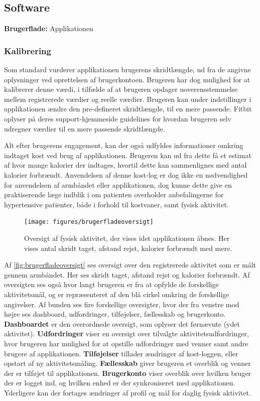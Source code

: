 \subsection{Software}
\textbf{Brugerflade:} %
Applikationen  

\subsubsection{Kalibrering}
Som standard vurderer applikationen brugerens skridtlængde, ud fra de angivne oplysninger ved oprettelsen af brugerkontoen. Brugeren har dog mulighed for at kalibrerer denne værdi, i tilfælde af at brugeren opdager uoverensstemmelse mellem registrerede værdier og reelle værdier. Brugeren kan under indstillinger i applikationen ændre den pre-defineret skridtlængde, til en mere passende. Fitbit oplyser på deres support-hjemmeside guidelines for hvordan brugeren selv udregner værdier til en mere passende skridtlængde.   

Alt efter brugerens engagement, kan der også udfyldes informationer omkring indtaget kost ved brug af applikationen. Brugeren kan ud fra dette få et estimat af hvor mange kalorier der indtages, hvortil dette kan sammenlignes med antal kalorier forbrændt. Anvendelsen af denne kost-log er dog ikke en nødvendighed for anvendelsen af armbåndet eller applikationen, dog kunne dette give en praktiserende læge indblik i om patienten overholder anbefalingerne for hypertensive patienter, både i forhold til kostvaner, samt fysisk aktivitet.  

\begin{figure}[H]
	\centering
	\texttt{[image: figures/brugerfladeoversigt]}
	\caption{Oversigt af fysisk aktivitet, der vises idet applikationen åbnes. Her vises antal skridt taget, afstand rejst, kalorier forbrændt med mere.}
	\label{fig:brugerfladeoversigt}
\end{figure}

Af \autoref{fig:brugerfladeoversigt} ses oversigt over den registrerede aktivitet som er målt gennem armbåndet. Her ses skridt taget, afstand rejst og kalorier forbrændt. Af oversigten ses også hvor langt brugeren er fra at opfylde de forskellige aktivitetsmål, og er repræsenteret af den blå cirkel omkring de forskellige angivelser. 
Af bunden ses fire forskellige oversigter, hvor der fra venstre mod højre ses dashboard, udfordringer, tilføjelser, fællesskab og brugerkonto. \textbf{Dashboardet} er den overordnede oversigt, som oplyser det førnævnte (ydet aktivitet). 
\textbf{Udfordringer} viser en oversigt over tilvalgte aktivitetsudfordringer, hvor brugeren har mulighed for at opstille udfordringer med venner samt andre brugere af applikationen. 
\textbf{Tilføjelser} tillader ændringer af kost-loggen, eller opstart af ny aktivitetsmåling. 
\textbf{Fællesskab} giver brugeren et overblik og venner der er tilføjet til applikationen. 
\textbf{Brugerkonto} viser overblik over hvilken bruger der er logget ind, og hvilken enhed er der synkroniseret med applikationen. Yderligere kan der fortages ændringer af profil og mål for daglig fysisk aktivitet. 

